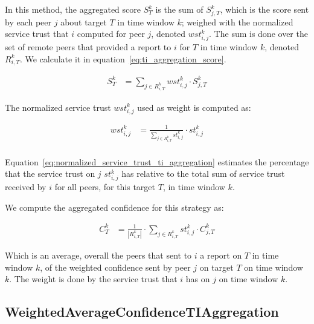 In this method, the aggregated score $S^{k}_{T}$ is the sum of $S^{k}_{j, T}$, which is the score sent by each peer $j$ about target $T$ in time window $k$; weighed with the normalized service trust that $i$ computed for peer $j$, denoted $wst^{k}_{i, j}$. The sum is done over the set of remote peers that provided a report to $i$ for $T$ in time window $k$, denoted $R^{k}_{i, T}$. We calculate it in equation~\ref{eq:ti_aggregation_score}.

\begin{equation}
\begin{split}
    S^{k}_{T} &= \sum_{{j}\in R^{k}_{i, T}} wst^{k}_{i, j} \cdot S^{k}_{j, T}
\end{split}
\label{eq:ti_aggregation_score}
\end{equation}

\noindent
The normalized service trust $wst^{k}_{i,j}$ used as weight is computed as:

\begin{equation}
\begin{split}
    wst^{k}_{i,j} &= \frac{1}{\sum_{{j}\in R^{k}_{i, T}} st^{k}_{i, j}} \cdot st^{k}_{i, j} \\
\end{split}
\label{eq:normalized_service_trust_ti_aggregation}
\end{equation}

\noindent
Equation~\ref{eq:normalized_service_trust_ti_aggregation} estimates the percentage that the service trust on $j$ $st^{k}_{i, j}$ has relative to the total sum of service trust received by $i$ for all peers, for this target $T$, in time window $k$.

We compute the aggregated confidence for this strategy as:

\begin{equation}
\begin{split}
    C^{k}_{T} &= \frac{1}{|R^{k}_{i, T}|} \cdot \sum_{{j}\in R^{k}_{i, T}} st^{k}_{i, j} \cdot C^{k}_{j, T}
\end{split}
\end{equation}

\noindent
Which is an average, overall the peers that sent to $i$ a report on $T$ in time window $k$, of the weighted confidence sent by peer $j$ on target $T$ on time window $k$. The weight is done by the service trust that $i$ has on $j$ on time window $k$.


\subsection{WeightedAverageConfidenceTIAggregation}
\label{subsec:WeightedAverageConfidenceTIAggregation}

